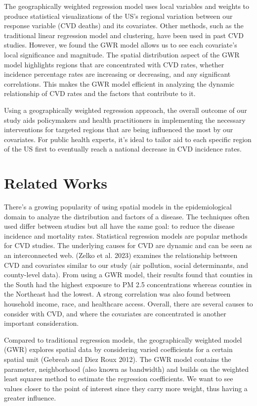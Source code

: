 \documentclass[
]{article}
\begin{document}
The geographically weighted regression model uses local variables and
weights to produce statistical visualizations of the US's regional
variation between our response variable (CVD deaths) and its covariates.
Other methods, such as the traditional linear regression model and
clustering, have been used in past CVD studies. However, we found the
GWR model allows us to see each covariate's local significance and
magnitude. The spatial distribution aspect of the GWR model highlights
regions that are concentrated with CVD rates, whether incidence
percentage rates are increasing or decreasing, and any significant
correlations. This makes the GWR model efficient in analyzing the
dynamic relationship of CVD rates and the factors that contribute to
it.~

Using a geographically weighted regression approach, the overall outcome
of our study aids policymakers and health practitioners in implementing
the necessary interventions for targeted regions that are being
influenced the most by our covariates. For public health experts, it's
ideal to tailor aid to each specific region of the US first to
eventually reach a national decrease in CVD incidence rates.

\section{Related Works}\label{related-works}

There's a growing popularity of using spatial models in the
epidemiological domain to analyze the distribution and factors of a
disease. The techniques often used differ between studies but all have
the same goal: to reduce the disease incidence and mortality rates.
Statistical regression models are popular methods for CVD studies. The
underlying causes for CVD are dynamic and can be seen as an
interconnected web. (Zelko et al. 2023) examines the relationship
between CVD and covariates similar to our study (air pollution, social
determinants, and county-level data). From using a GWR model, their
results found that counties in the South had the highest exposure to PM
2.5 concentrations whereas counties in the Northeast had the lowest. A
strong correlation was also found between household income, race, and
healthcare access. Overall, there are several causes to consider with
CVD, and where the covariates are concentrated is another important
consideration.

Compared to traditional regression models, the geographically weighted
model (GWR) explores spatial data by considering varied coefficients for
a certain spatial unit (Gebreab and Diez Roux 2012). The GWR model
contains the parameter, neighborhood (also known as bandwidth) and
builds on the weighted least squares method to estimate the regression
coefficients. We want to see values closer to the point of interest
since they carry more weight, thus having a greater influence.~
\end{document}
